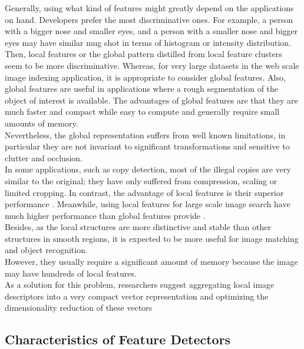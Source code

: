 Generally, using what kind of features might greatly depend on the applications
on hand. Developers prefer the most discriminative ones. For example, a person with
a bigger nose and smaller eyes, and a person with a smaller nose and bigger eyes
may have similar mug shot in terms of histogram or intensity distribution. Then, local
features or the global pattern distilled from local feature clusters seem to be more
discriminative. Whereas, for very large datasets in the web scale image indexing
application, it is appropriate to consider global features. Also, global features are
useful in applications where a rough segmentation of the object of interest is available.
The advantages of global features are that they are much faster and compact
while easy to compute and generally require small amounts of memory.\\ Nevertheless,
the global representation suffers from well known limitations, in particular they
are not invariant to significant transformations and sensitive to clutter and occlusion.\\In some applications, such as copy detection, most of the illegal copies are very  similar to the original; they have only suffered from compression, scaling or limited
cropping. In contrast, the advantage of local features is their superior performance \cite{i}. Meanwhile, using local features for large scale image search have much higher performance than global features provide \cite{k}.\\ Besides, as the local structures are more distinctive and stable than other structures in smooth regions, it is expected to be more useful for image matching and object recognition.\\ However, they usually require a significant amount of memory because the image may have hundreds of local features.\\ As a solution for this problem, researchers suggest aggregating local image descriptors into a very compact vector representation and optimizing the
dimensionality reduction of these vectors \cite{k}


\subsection{Characteristics of Feature Detectors}

